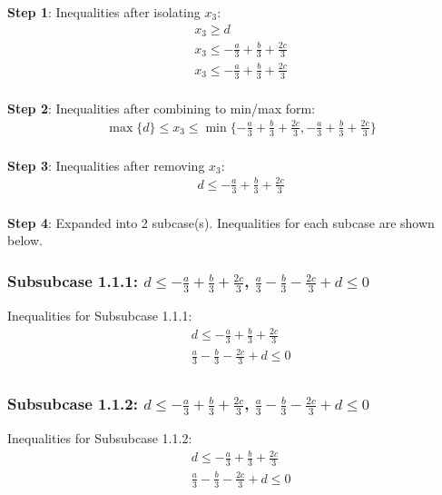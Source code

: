 \documentclass{article}
\begin{document}
\textbf{Step 1}: Inequalities after isolating $x_{3}$:
\begin{align}
& x_{3} \geq d \\
& x_{3} \leq - \frac{a}{3} + \frac{b}{3} + \frac{2 c}{3} \\
& x_{3} \leq - \frac{a}{3} + \frac{b}{3} + \frac{2 c}{3} \\
\end{align}

\textbf{Step 2}: Inequalities after combining to min/max form:
\begin{align}
& \max\{d\} \leq x_{3} \leq \min\{- \frac{a}{3} + \frac{b}{3} + \frac{2 c}{3}, - \frac{a}{3} + \frac{b}{3} + \frac{2 c}{3}\} \\
\end{align}

\textbf{Step 3}: Inequalities after removing $x_{3}$:
\begin{align}
& d \leq - \frac{a}{3} + \frac{b}{3} + \frac{2 c}{3} \\
\end{align}

\textbf{Step 4}: Expanded into 2 subcase(s). Inequalities for each subcase are shown below.

\subsubsection{Subsubcase 1.1.1: $d \leq - \frac{a}{3} + \frac{b}{3} + \frac{2 c}{3}$, $\frac{a}{3} - \frac{b}{3} - \frac{2 c}{3} + d \leq 0$}

Inequalities for Subsubcase 1.1.1:
\begin{align}
& d \leq - \frac{a}{3} + \frac{b}{3} + \frac{2 c}{3} \\
& \frac{a}{3} - \frac{b}{3} - \frac{2 c}{3} + d \leq 0 \\
\end{align}

\subsubsection{Subsubcase 1.1.2: $d \leq - \frac{a}{3} + \frac{b}{3} + \frac{2 c}{3}$, $\frac{a}{3} - \frac{b}{3} - \frac{2 c}{3} + d \leq 0$}

Inequalities for Subsubcase 1.1.2:
\begin{align}
& d \leq - \frac{a}{3} + \frac{b}{3} + \frac{2 c}{3} \\
& \frac{a}{3} - \frac{b}{3} - \frac{2 c}{3} + d \leq 0 \\
\end{align}
\end{document}
